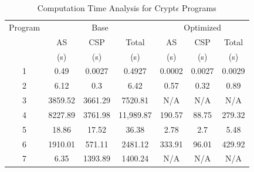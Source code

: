 \begin{table}[ht]
\caption{Computation Time Analysis for Crypt$\epsilon$ Programs}
\centering
\begin{tabular}{c c c c c c c}
\toprule
Program &  \multicolumn{3}{c}{Base} & \multicolumn{3}{c}{Optimized} \\ 
 & AS &  CSP & Total & AS & CSP & Total \\ &(s)&(s)&(s)&(s)&(s)&(s)\\ %
\midrule
1 & 0.49& 0.0027& 0.4927 & 0.0002 &0.0027 & 0.0029 \\
2 &  6.12 & 0.3  &6.42 &0.57&0.32& 0.89\\ %
3&  3859.52 & 3661.29 & 7520.81&N/A&N/A &N/A \\4  &8227.89&3761.98&11,989.87&190.57&88.75& 279.32\\5&18.86&17.52&36.38&2.78&2.7&5.48\\6&1910.01&571.11&2481.12&333.91&96.01&429.92\\7&6.35 & 1393.89 & 1400.24 &  N/A & N/A & N/A\\ [1ex]
\bottomrule
\end{tabular}
\label{c}
\end{table}




